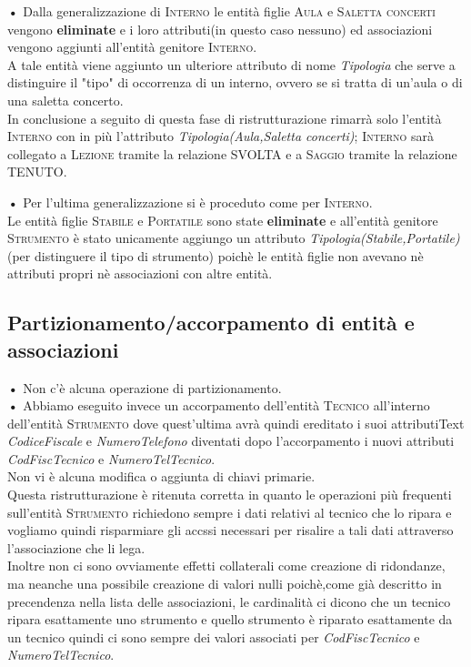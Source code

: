 \documentclass{article}
\begin{document}
\begin{flushleft}
\textbf{•} Dalla generalizzazione di \textsc{Interno} le entità figlie \textsc{Aula} e \textsc{Saletta concerti} vengono \textbf{eliminate} e i loro attributi(in questo caso nessuno) ed associazioni vengono aggiunti all'entità genitore \textsc{Interno}.\\
A tale entità viene aggiunto un ulteriore attributo di nome \emph{Tipologia} che serve a distinguire il "tipo" di occorrenza di un interno, ovvero se si tratta di un'aula o di una saletta concerto.\smallskip
\\In conclusione a seguito di questa fase di ristrutturazione rimarrà solo l'entità \textsc{Interno} con in più l'attributo \emph{Tipologia(Aula,Saletta concerti)}; \textsc{Interno} sarà collegato a \textsc{Lezione} tramite la relazione SVOLTA e a \textsc{Saggio} tramite la relazione TENUTO.
\end{flushleft}

\bigskip

\begin{flushleft}
\textbf{•} Per l'ultima generalizzazione si è proceduto come per \textsc{Interno}.\\
Le entità figlie \textsc{Stabile} e \textsc{Portatile} sono state \textbf{eliminate} e all'entità genitore \textsc{Strumento} è stato unicamente aggiungo un attributo \emph{Tipologia(Stabile,Portatile)} (per distinguere il tipo di strumento) poichè le entità figlie non avevano nè attributi propri nè associazioni con altre entità.
\end{flushleft}

\subsection{Partizionamento/accorpamento di entità e associazioni}\medskip

\textbf{•} Non c'è alcuna operazione di partizionamento.\bigskip
\\
\textbf{•} Abbiamo eseguito invece un accorpamento dell'entità \textsc{Tecnico} all'interno dell'entità \textsc{Strumento} dove quest'ultima avrà quindi ereditato i suoi  attributiText \emph{CodiceFiscale} e \emph{NumeroTelefono} diventati dopo l'accorpamento i nuovi attributi \emph{CodFiscTecnico} e \emph{NumeroTelTecnico}.\\Non vi è alcuna modifica o aggiunta di chiavi primarie.\medskip
\\
Questa ristrutturazione è ritenuta corretta in quanto le operazioni più frequenti sull'entità \textsc{Strumento} richiedono sempre i dati relativi al tecnico che lo ripara e vogliamo quindi risparmiare gli accssi necessari per risalire a tali dati attraverso l'associazione che li lega.\medskip
\\Inoltre non ci sono ovviamente effetti collaterali come creazione di ridondanze, ma neanche una possibile creazione di valori nulli poichè,come già descritto in precendenza nella lista delle associazioni, le cardinalità ci dicono che un tecnico ripara esattamente uno strumento e quello strumento è riparato esattamente da un tecnico quindi ci sono sempre dei valori associati per \emph{CodFiscTecnico} e \emph{NumeroTelTecnico}.
\end{document}
